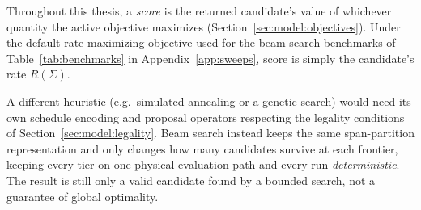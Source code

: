 Throughout this thesis, a \emph{score} is the returned candidate's value of whichever quantity the active objective maximizes (Section~\ref{sec:model:objectives}). Under the default rate-maximizing objective used for the beam-search benchmarks of Table~\ref{tab:benchmarks} in Appendix~\ref{app:sweeps}, score is simply the candidate's rate $R(\Sigma)$.

A different heuristic (e.g.\ simulated annealing or a genetic search) would need its own schedule encoding and proposal operators respecting the legality conditions of Section~\ref{sec:model:legality}. Beam search instead keeps the same span-partition representation and only changes how many candidates survive at each frontier, keeping every tier on one physical evaluation path and every run \emph{deterministic}. The result is still only a valid candidate found by a bounded search, not a guarantee of global optimality.